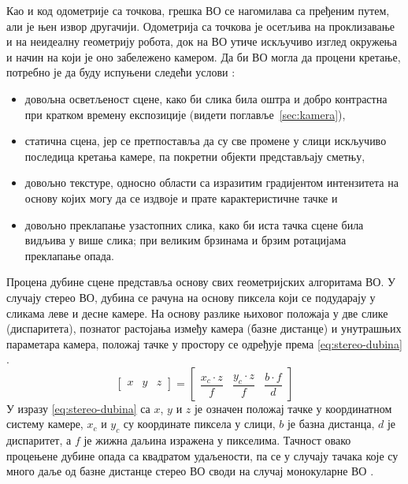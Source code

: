 \documentclass[12pt]{article}
\begin{document}
Као и код одометрије са точкова, грешка ВО се нагомилава са пређеним путем, али
је њен извор другачији. Одометрија са точкова је осетљива на проклизавање и на
неидеалну геометрију робота, док на ВО утиче искључиво изглед окружења и начин
на који је оно забележено камером. Да би ВО могла да процени кретање, потребно
је да буду испуњени следећи услови \cite{scaramuzza2011visual}:
\begin{itemize}
	\item довољна осветљеност сцене, како би слика била оштра и добро
	      контрастна при кратком времену експозиције (видети
	      поглавље~\ref{sec:kamera}),
	\item статична сцена, јер се претпоставља да су све промене у слици
	      искључиво последица кретања камере, па покретни објекти представљају
	      сметњу,
	\item довољно текстуре, односно области са изразитим градијентом
	      интензитета на основу којих могу да се издвоје и прате
	      карактеристичне тачке и
	\item довољно преклапање узастопних слика, како би иста тачка сцене била
	      видљива у више слика; при великим брзинама и брзим ротацијама
	      преклапање опада.
\end{itemize}

Процена дубине сцене представља основу свих геометријских алгоритама ВО. У
случају стерео ВО, дубина се рачуна на основу пиксела који се подударају у
сликама леве и десне камере. На основу разлике њиховог положаја у две слике
(диспаритета), познатог растојања између камера (базне дистанце) и унутрашњих
параметара камера, положај тачке у простору се одређује према
\eqref{eq:stereo-dubina} \cite{kostavelis2016stereo}.
\begin{equation}
	\begin{bmatrix} x & y & z \end{bmatrix}
	= \begin{bmatrix} \dfrac{x_c \cdot z}{f} & \dfrac{y_c \cdot z}{f} & \dfrac{b \cdot f}{d} \end{bmatrix}
	\label{eq:stereo-dubina}
\end{equation}
У изразу \eqref{eq:stereo-dubina} са $x$, $y$ и $z$ је означен положај тачке у
координатном систему камере, $x_c$ и $y_c$ су координате пиксела у слици, $b$
је базна дистанца, $d$ је диспаритет, а $f$ је жижна даљина изражена у
пикселима. Тачност овако процењене дубине опада са квадратом удаљености, па се
у случају тачака које су много даље од базне дистанце стерео ВО своди на
случај монокуларне ВО \cite{scaramuzza2011visual}.
\end{document}
